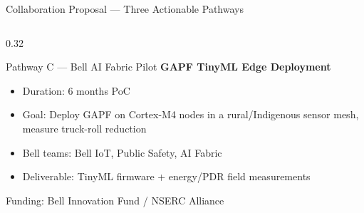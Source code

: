 \documentclass[aspectratio=169, 11pt]{beamer}
\begin{document}
\begin{frame}{Collaboration Proposal — Three Actionable Pathways}
\begin{columns}[T]
\begin{column}{0.32\textwidth}
  \begin{exampleblock}{Pathway C — Bell AI Fabric Pilot}
    \vspace{2pt}
    \textbf{GAPF TinyML Edge Deployment}\\[4pt]
    \begin{itemize}\setlength{\itemsep}{2pt}
      \item[\textbullet] Duration: 6 months PoC
      \item[\textbullet] Goal: Deploy GAPF on Cortex-M4 nodes in a rural/Indigenous sensor mesh, measure truck-roll reduction
      \item[\textbullet] Bell teams: Bell IoT, Public Safety, AI Fabric
      \item[\textbullet] Deliverable: TinyML firmware + energy/PDR field measurements
    \end{itemize}
    \vspace{2pt}
    {\scriptsize Funding: Bell Innovation Fund / NSERC Alliance}
  \end{exampleblock}
\end{column}

\end{columns}

\vspace{4pt}

\end{frame}
\end{document}
